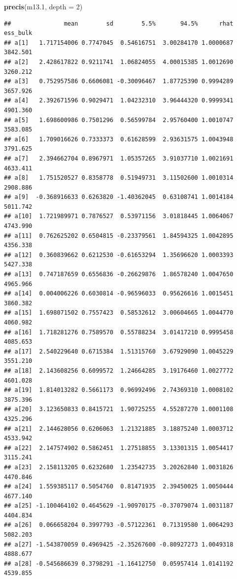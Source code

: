 \documentclass[
]{book}
\newenvironment{Shaded}{\begin{snugshade}}{\end{snugshade}}
\newcommand{\AttributeTok}[1]{\textcolor[rgb]{0.13,0.29,0.53}{#1}}
\newcommand{\DecValTok}[1]{\textcolor[rgb]{0.00,0.00,0.81}{#1}}
\newcommand{\FloatTok}[1]{\textcolor[rgb]{0.00,0.00,0.81}{#1}}
\newcommand{\FunctionTok}[1]{\textcolor[rgb]{0.13,0.29,0.53}{\textbf{#1}}}
\newcommand{\NormalTok}[1]{#1}
\begin{document}
\begin{Shaded}
\begin{Highlighting}[]
\FunctionTok{precis}\NormalTok{(m13}\FloatTok{.1}\NormalTok{, }\AttributeTok{depth =} \DecValTok{2}\NormalTok{)}
\end{Highlighting}
\end{Shaded}

\begin{verbatim}
##               mean        sd        5.5%       94.5%      rhat ess_bulk
## a[1]   1.717154006 0.7747045  0.54616751  3.00284170 1.0000687 3842.501
## a[2]   2.428617822 0.9211741  1.06824055  4.00015385 1.0012690 3260.212
## a[3]   0.752957586 0.6606081 -0.30096467  1.87725390 0.9994289 3657.926
## a[4]   2.392671596 0.9029471  1.04232310  3.96444320 0.9999341 4901.360
## a[5]   1.698600986 0.7501296  0.56599784  2.95760400 1.0010747 3583.085
## a[6]   1.709016626 0.7333373  0.61628599  2.93631575 1.0043948 3791.625
## a[7]   2.394662704 0.8967971  1.05357265  3.91037710 1.0021691 4633.411
## a[8]   1.751520527 0.8358778  0.51949731  3.11502600 1.0010314 2908.886
## a[9]  -0.368916633 0.6263820 -1.40362045  0.63108741 1.0014184 5011.742
## a[10]  1.721989971 0.7876527  0.53971156  3.01818445 1.0064067 4743.990
## a[11]  0.762625202 0.6504815 -0.23379561  1.84594325 1.0042895 4356.338
## a[12]  0.360839662 0.6212530 -0.61653294  1.35696620 1.0003393 5427.338
## a[13]  0.747187659 0.6556836 -0.26629876  1.86578240 1.0047650 4965.966
## a[14]  0.004006226 0.6030814 -0.96596033  0.95626616 1.0015451 3860.382
## a[15]  1.698071502 0.7557423  0.58532612  3.00604665 1.0044770 4060.982
## a[16]  1.718281276 0.7589570  0.55788234  3.01417210 0.9995458 4085.653
## a[17]  2.540229640 0.6715384  1.51315760  3.67929090 1.0045229 3551.210
## a[18]  2.143608256 0.6099572  1.24664285  3.19176460 1.0027772 4601.028
## a[19]  1.814013282 0.5661173  0.96992496  2.74369310 1.0008102 3875.396
## a[20]  3.123650833 0.8415721  1.90725255  4.55287270 1.0001108 4325.296
## a[21]  2.144628056 0.6206063  1.21321885  3.18875240 1.0003712 4533.942
## a[22]  2.147574902 0.5862451  1.27518855  3.13301315 1.0054417 3115.241
## a[23]  2.158113205 0.6232680  1.23542735  3.20262840 1.0031826 4470.846
## a[24]  1.559385117 0.5054760  0.81471935  2.39450025 1.0050444 4677.140
## a[25] -1.100464102 0.4645629 -1.90970175 -0.37079074 1.0031187 4404.834
## a[26]  0.066658204 0.3997793 -0.57122361  0.71319580 1.0064293 5082.203
## a[27] -1.543870059 0.4969425 -2.35267600 -0.80927273 1.0049318 4888.677
## a[28] -0.545686639 0.3798291 -1.16412750  0.05957414 1.0141192 4539.855

\end{verbatim}
\end{document}
